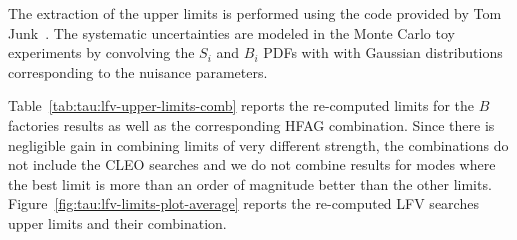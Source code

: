 The extraction of the upper limits is performed using the code provided by
Tom Junk~\cite{junk:2007:cdfnote}. The systematic uncertainties are modeled
in the Monte Carlo toy experiments by convolving the $S_i$ and $B_i$
PDFs with with Gaussian distributions corresponding to the nuisance
parameters. 

Table~\ref{tab:tau:lfv-upper-limits-comb} reports the re-computed limits
for the $B$ factories results as well as the corresponding HFAG
combination. Since there is negligible gain in combining limits of very
different strength, the combinations do not include the CLEO searches and we do not
combine results for modes where the best limit is more than an order of
magnitude better than the other limits.
Figure~\ref{fig:tau:lfv-limits-plot-average} reports the re-computed \mtau
LFV searches upper limits and their combination.



